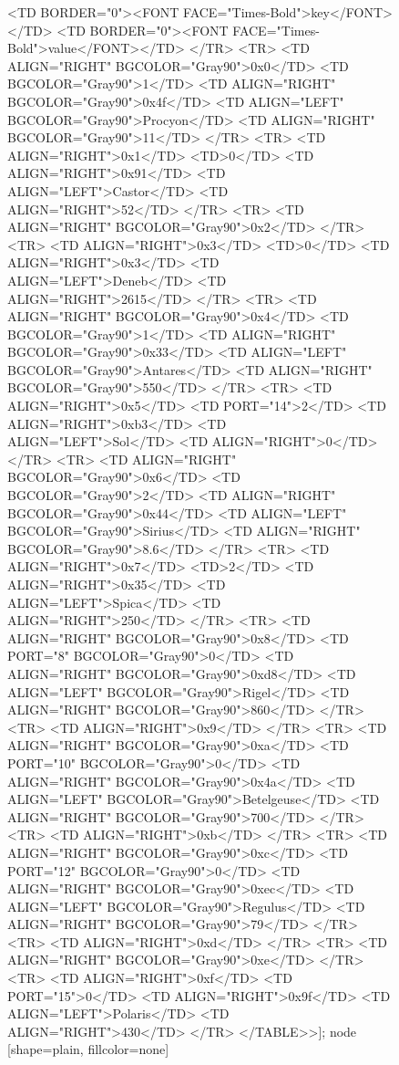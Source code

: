 \documentclass[12pt]{article}
\begin{document}
\begin{figure}
{{		<TD BORDER="0"><FONT FACE="Times-Bold">key</FONT></TD>
		<TD BORDER="0"><FONT FACE="Times-Bold">value</FONT></TD>
	</TR>
	<TR>
		<TD ALIGN="RIGHT" BGCOLOR="Gray90">0x0</TD>
		<TD BGCOLOR="Gray90">1</TD>
		<TD ALIGN="RIGHT" BGCOLOR="Gray90">0x4f</TD>
		<TD ALIGN="LEFT" BGCOLOR="Gray90">Procyon</TD>
		<TD ALIGN="RIGHT" BGCOLOR="Gray90">11</TD>
	</TR>
	<TR>
		<TD ALIGN="RIGHT">0x1</TD>
		<TD>0</TD>
		<TD ALIGN="RIGHT">0x91</TD>
		<TD ALIGN="LEFT">Castor</TD>
		<TD ALIGN="RIGHT">52</TD>
	</TR>
	<TR>
		<TD ALIGN="RIGHT" BGCOLOR="Gray90">0x2</TD>
	</TR>
	<TR>
		<TD ALIGN="RIGHT">0x3</TD>
		<TD>0</TD>
		<TD ALIGN="RIGHT">0x3</TD>
		<TD ALIGN="LEFT">Deneb</TD>
		<TD ALIGN="RIGHT">2615</TD>
	</TR>
	<TR>
		<TD ALIGN="RIGHT" BGCOLOR="Gray90">0x4</TD>
		<TD BGCOLOR="Gray90">1</TD>
		<TD ALIGN="RIGHT" BGCOLOR="Gray90">0x33</TD>
		<TD ALIGN="LEFT" BGCOLOR="Gray90">Antares</TD>
		<TD ALIGN="RIGHT" BGCOLOR="Gray90">550</TD>
	</TR>
	<TR>
		<TD ALIGN="RIGHT">0x5</TD>
		<TD PORT="14">2</TD>
		<TD ALIGN="RIGHT">0xb3</TD>
		<TD ALIGN="LEFT">Sol</TD>
		<TD ALIGN="RIGHT">0</TD>
	</TR>
	<TR>
		<TD ALIGN="RIGHT" BGCOLOR="Gray90">0x6</TD>
		<TD BGCOLOR="Gray90">2</TD>
		<TD ALIGN="RIGHT" BGCOLOR="Gray90">0x44</TD>
		<TD ALIGN="LEFT" BGCOLOR="Gray90">Sirius</TD>
		<TD ALIGN="RIGHT" BGCOLOR="Gray90">8.6</TD>
	</TR>
	<TR>
		<TD ALIGN="RIGHT">0x7</TD>
		<TD>2</TD>
		<TD ALIGN="RIGHT">0x35</TD>
		<TD ALIGN="LEFT">Spica</TD>
		<TD ALIGN="RIGHT">250</TD>
	</TR>
	<TR>
		<TD ALIGN="RIGHT" BGCOLOR="Gray90">0x8</TD>
		<TD PORT="8" BGCOLOR="Gray90">0</TD>
		<TD ALIGN="RIGHT" BGCOLOR="Gray90">0xd8</TD>
		<TD ALIGN="LEFT" BGCOLOR="Gray90">Rigel</TD>
		<TD ALIGN="RIGHT" BGCOLOR="Gray90">860</TD>
	</TR>
	<TR>
		<TD ALIGN="RIGHT">0x9</TD>
	</TR>
	<TR>
		<TD ALIGN="RIGHT" BGCOLOR="Gray90">0xa</TD>
		<TD PORT="10" BGCOLOR="Gray90">0</TD>
		<TD ALIGN="RIGHT" BGCOLOR="Gray90">0x4a</TD>
		<TD ALIGN="LEFT" BGCOLOR="Gray90">Betelgeuse</TD>
		<TD ALIGN="RIGHT" BGCOLOR="Gray90">700</TD>
	</TR>
	<TR>
		<TD ALIGN="RIGHT">0xb</TD>
	</TR>
	<TR>
		<TD ALIGN="RIGHT" BGCOLOR="Gray90">0xc</TD>
		<TD PORT="12" BGCOLOR="Gray90">0</TD>
		<TD ALIGN="RIGHT" BGCOLOR="Gray90">0xec</TD>
		<TD ALIGN="LEFT" BGCOLOR="Gray90">Regulus</TD>
		<TD ALIGN="RIGHT" BGCOLOR="Gray90">79</TD>
	</TR>
	<TR>
		<TD ALIGN="RIGHT">0xd</TD>
	</TR>
	<TR>
		<TD ALIGN="RIGHT" BGCOLOR="Gray90">0xe</TD>
	</TR>
	<TR>
		<TD ALIGN="RIGHT">0xf</TD>
		<TD PORT="15">0</TD>
		<TD ALIGN="RIGHT">0x9f</TD>
		<TD ALIGN="LEFT">Polaris</TD>
		<TD ALIGN="RIGHT">430</TD>
	</TR>
</TABLE>>];
	node [shape=plain, fillcolor=none]
		}
	}
\end{figure}
\end{document}

